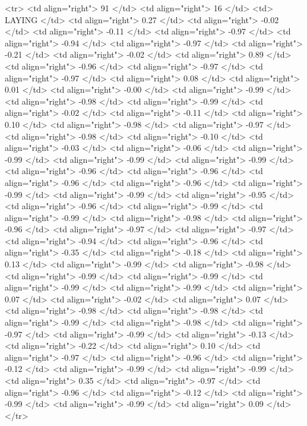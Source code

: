   <tr> <td align="right"> 91 </td> <td align="right">  16 </td> <td> LAYING </td> <td align="right"> 0.27 </td> <td align="right"> -0.02 </td> <td align="right"> -0.11 </td> <td align="right"> -0.97 </td> <td align="right"> -0.94 </td> <td align="right"> -0.97 </td> <td align="right"> -0.21 </td> <td align="right"> -0.02 </td> <td align="right"> 0.89 </td> <td align="right"> -0.96 </td> <td align="right"> -0.97 </td> <td align="right"> -0.97 </td> <td align="right"> 0.08 </td> <td align="right"> 0.01 </td> <td align="right"> -0.00 </td> <td align="right"> -0.99 </td> <td align="right"> -0.98 </td> <td align="right"> -0.99 </td> <td align="right"> -0.02 </td> <td align="right"> -0.11 </td> <td align="right"> 0.10 </td> <td align="right"> -0.98 </td> <td align="right"> -0.97 </td> <td align="right"> -0.98 </td> <td align="right"> -0.10 </td> <td align="right"> -0.03 </td> <td align="right"> -0.06 </td> <td align="right"> -0.99 </td> <td align="right"> -0.99 </td> <td align="right"> -0.99 </td> <td align="right"> -0.96 </td> <td align="right"> -0.96 </td> <td align="right"> -0.96 </td> <td align="right"> -0.96 </td> <td align="right"> -0.99 </td> <td align="right"> -0.99 </td> <td align="right"> -0.95 </td> <td align="right"> -0.96 </td> <td align="right"> -0.99 </td> <td align="right"> -0.99 </td> <td align="right"> -0.98 </td> <td align="right"> -0.96 </td> <td align="right"> -0.97 </td> <td align="right"> -0.97 </td> <td align="right"> -0.94 </td> <td align="right"> -0.96 </td> <td align="right"> -0.35 </td> <td align="right"> -0.18 </td> <td align="right"> 0.13 </td> <td align="right"> -0.99 </td> <td align="right"> -0.98 </td> <td align="right"> -0.99 </td> <td align="right"> -0.99 </td> <td align="right"> -0.99 </td> <td align="right"> -0.99 </td> <td align="right"> 0.07 </td> <td align="right"> -0.02 </td> <td align="right"> 0.07 </td> <td align="right"> -0.98 </td> <td align="right"> -0.98 </td> <td align="right"> -0.99 </td> <td align="right"> -0.98 </td> <td align="right"> -0.97 </td> <td align="right"> -0.99 </td> <td align="right"> -0.13 </td> <td align="right"> -0.22 </td> <td align="right"> 0.10 </td> <td align="right"> -0.97 </td> <td align="right"> -0.96 </td> <td align="right"> -0.12 </td> <td align="right"> -0.99 </td> <td align="right"> -0.99 </td> <td align="right"> 0.35 </td> <td align="right"> -0.97 </td> <td align="right"> -0.96 </td> <td align="right"> -0.12 </td> <td align="right"> -0.99 </td> <td align="right"> -0.99 </td> <td align="right"> 0.09 </td> </tr>
